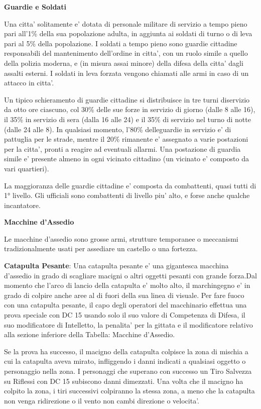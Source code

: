 \documentclass[a4paper,11pt,twoside,openany]{book}
\begin{document}
\textbf{Guardie e Soldati}

Una citta' solitamente e' dotata di personale militare di servizio a tempo pieno pari all'1\% della sua popolazione adulta, in aggiunta ai soldati di turno o di leva pari al 5\% della popolazione. I soldati a tempo pieno sono guardie cittadine responsabili del mantenimento dell'ordine in citta', con un ruolo simile a quello della polizia moderna, e (in misura assai minore) della difesa della citta' dagli assalti esterni. I soldati in leva forzata vengono chiamati alle armi in caso di un attacco in citta'.

Un tipico schieramento di guardie cittadine si distribuisce in tre turni diservizio da otto ore ciascuno, col 30\% delle sue forze in servizio di giorno (dalle 8 alle 16), il 35\% in servizio di sera (dalla 16 alle 24) e il 35\% di servizio nel turno di notte (dalle 24 alle 8). In qualsiasi momento, l'80\% delleguardie in servizio e' di pattuglia per le strade, mentre il 20\% rimanente e' assegnato a varie postazioni per la citta', pronti a reagire ad eventuali allarmi. Una postazione di guardia simile e' presente almeno in ogni vicinato cittadino (un vicinato e' composto da vari quartieri).

La maggioranza delle guardie cittadine e' composta da combattenti, quasi tutti di 1° livello. Gli ufficiali sono combattenti di livello piu' alto, e forse anche qualche incantatore.

\textbf{Macchine d'Assedio}

Le macchine d'assedio sono grosse armi, strutture temporanee o meccanismi tradizionalmente usati per assediare un castello o una fortezza.

\textbf{Catapulta Pesante}: Una catapulta pesante e' una gigantesca macchina d'assedio in grado di scagliare macigni o altri oggetti pesanti con grande forza.Dal momento che l'arco di lancio della catapulta e' molto alto, il marchingegno e' in grado di colpire anche aree al di fuori della sua linea di visuale. Per fare fuoco con una catapulta pesante, il capo degli operatori del macchinario effettua una prova speciale con DC 15 usando solo il suo valore di Competenza di Difesa, il suo modificatore di Intelletto, la penalita' per la gittata e il modificatore relativo alla sezione inferiore della Tabella: Macchine d'Assedio. 

Se la prova ha successo, il macigno della catapulta colpisce la zona di mischia a cui la catapulta aveva mirato, infliggendo i danni indicati a qualsiasi oggetto o personaggio nella zona. I personaggi che superano con successo un Tiro Salvezza su Riflessi con DC 15 subiscono danni dimezzati. Una volta che il macigno ha colpito la zona, i tiri successivi colpiranno la stessa zona, a meno che la catapulta non venga ridirezione o il vento non cambi direzione o velocita'.
\end{document}
